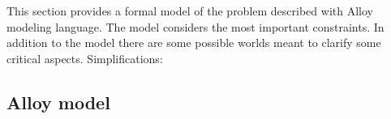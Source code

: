 This section provides a formal model of the problem described with Alloy modeling language. 
The model considers the most important constraints. In addition to the model there are some 
possible worlds meant to clarify some critical aspects.
Simplifications: 

\subsection{Alloy model}
